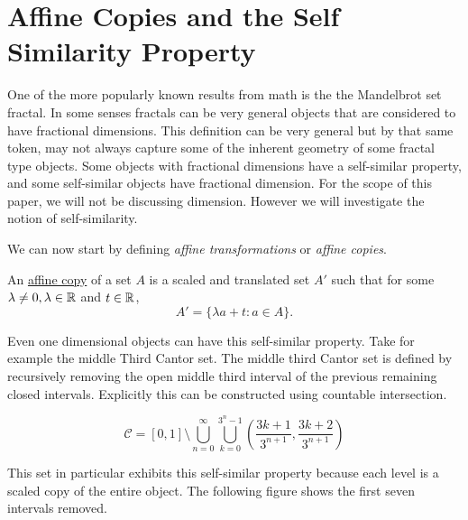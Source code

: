 \section{Affine Copies and the Self Similarity Property}


One of the more popularly known results from math is the the Mandelbrot set fractal.  In some senses fractals can be very general objects that are considered to have fractional dimensions.  This definition can be very general but by that same token, may not always capture some of the inherent geometry of some fractal type objects. Some objects with fractional dimensions have a self-similar property, and some self-similar objects have fractional dimension.  For the scope of this paper, we will not be discussing dimension. However we will investigate the notion of self-similarity. 

We can now start by defining \textit{affine transformations} or \textit{affine copies}.
\begin{definition}
    An \underline{affine copy} of a set $A$ is a scaled and translated set $A'$ such that for some $\lambda\neq 0, \lambda \in \mathbb{R}$ and $t \in \mathbb{R}$,  $$A' = \{\lambda a + t : a \in A\}.$$
\end{definition}

Even one dimensional objects can have this self-similar property. Take for example the middle Third Cantor set.  The middle third Cantor set is defined by recursively removing the open middle third interval of the previous remaining closed intervals.  Explicitly this can be constructed using countable intersection.  

\begin{example}\label{middleThirdCantor}
    $$\mathcal{C} = [0,1] \setminus \bigcup_{n=0}^\infty\bigcup_{k=0}^{3^n-1}\left(\frac{3k+1}{3^{n+1}},\frac{3k+2}{3^{n+1}}\right)$$
\end{example}

This set in particular exhibits this self-similar property because each level is a scaled copy of the entire object.  The following figure shows the first seven intervals removed.  

